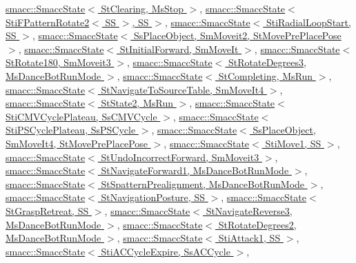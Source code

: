 \hyperlink{classsmacc_1_1SmaccState_afc39f8e0ca4001b2159a100da2fccd0e}{smacc\+::\+Smacc\+State$<$ St\+Clearing, Ms\+Stop $>$}, \hyperlink{classsmacc_1_1SmaccState_afc39f8e0ca4001b2159a100da2fccd0e}{smacc\+::\+Smacc\+State$<$ Sti\+F\+Pattern\+Rotate2$<$ S\+S $>$, S\+S $>$}, \hyperlink{classsmacc_1_1SmaccState_afc39f8e0ca4001b2159a100da2fccd0e}{smacc\+::\+Smacc\+State$<$ Sti\+Radial\+Loop\+Start, S\+S $>$}, \hyperlink{classsmacc_1_1SmaccState_afc39f8e0ca4001b2159a100da2fccd0e}{smacc\+::\+Smacc\+State$<$ Ss\+Place\+Object, Sm\+Moveit2, St\+Move\+Pre\+Place\+Pose $>$}, \hyperlink{classsmacc_1_1SmaccState_afc39f8e0ca4001b2159a100da2fccd0e}{smacc\+::\+Smacc\+State$<$ St\+Initial\+Forward, Sm\+Move\+It $>$}, \hyperlink{classsmacc_1_1SmaccState_afc39f8e0ca4001b2159a100da2fccd0e}{smacc\+::\+Smacc\+State$<$ St\+Rotate180, Sm\+Moveit3 $>$}, \hyperlink{classsmacc_1_1SmaccState_afc39f8e0ca4001b2159a100da2fccd0e}{smacc\+::\+Smacc\+State$<$ St\+Rotate\+Degrees3, Ms\+Dance\+Bot\+Run\+Mode $>$}, \hyperlink{classsmacc_1_1SmaccState_afc39f8e0ca4001b2159a100da2fccd0e}{smacc\+::\+Smacc\+State$<$ St\+Completing, Ms\+Run $>$}, \hyperlink{classsmacc_1_1SmaccState_afc39f8e0ca4001b2159a100da2fccd0e}{smacc\+::\+Smacc\+State$<$ St\+Navigate\+To\+Source\+Table, Sm\+Move\+It4 $>$}, \hyperlink{classsmacc_1_1SmaccState_afc39f8e0ca4001b2159a100da2fccd0e}{smacc\+::\+Smacc\+State$<$ St\+State2, Ms\+Run $>$}, \hyperlink{classsmacc_1_1SmaccState_afc39f8e0ca4001b2159a100da2fccd0e}{smacc\+::\+Smacc\+State$<$ Sti\+C\+M\+V\+Cycle\+Plateau, Ss\+C\+M\+V\+Cycle $>$}, \hyperlink{classsmacc_1_1SmaccState_afc39f8e0ca4001b2159a100da2fccd0e}{smacc\+::\+Smacc\+State$<$ Sti\+P\+S\+Cycle\+Plateau, Ss\+P\+S\+Cycle $>$}, \hyperlink{classsmacc_1_1SmaccState_afc39f8e0ca4001b2159a100da2fccd0e}{smacc\+::\+Smacc\+State$<$ Ss\+Place\+Object, Sm\+Move\+It4, St\+Move\+Pre\+Place\+Pose $>$}, \hyperlink{classsmacc_1_1SmaccState_afc39f8e0ca4001b2159a100da2fccd0e}{smacc\+::\+Smacc\+State$<$ Sti\+Move1, S\+S $>$}, \hyperlink{classsmacc_1_1SmaccState_afc39f8e0ca4001b2159a100da2fccd0e}{smacc\+::\+Smacc\+State$<$ St\+Undo\+Incorrect\+Forward, Sm\+Moveit3 $>$}, \hyperlink{classsmacc_1_1SmaccState_afc39f8e0ca4001b2159a100da2fccd0e}{smacc\+::\+Smacc\+State$<$ St\+Navigate\+Forward1, Ms\+Dance\+Bot\+Run\+Mode $>$}, \hyperlink{classsmacc_1_1SmaccState_afc39f8e0ca4001b2159a100da2fccd0e}{smacc\+::\+Smacc\+State$<$ St\+Spattern\+Prealignment, Ms\+Dance\+Bot\+Run\+Mode $>$}, \hyperlink{classsmacc_1_1SmaccState_afc39f8e0ca4001b2159a100da2fccd0e}{smacc\+::\+Smacc\+State$<$ St\+Navigation\+Posture, S\+S $>$}, \hyperlink{classsmacc_1_1SmaccState_afc39f8e0ca4001b2159a100da2fccd0e}{smacc\+::\+Smacc\+State$<$ St\+Grasp\+Retreat, S\+S $>$}, \hyperlink{classsmacc_1_1SmaccState_afc39f8e0ca4001b2159a100da2fccd0e}{smacc\+::\+Smacc\+State$<$ St\+Navigate\+Reverse3, Ms\+Dance\+Bot\+Run\+Mode $>$}, \hyperlink{classsmacc_1_1SmaccState_afc39f8e0ca4001b2159a100da2fccd0e}{smacc\+::\+Smacc\+State$<$ St\+Rotate\+Degrees2, Ms\+Dance\+Bot\+Run\+Mode $>$}, \hyperlink{classsmacc_1_1SmaccState_afc39f8e0ca4001b2159a100da2fccd0e}{smacc\+::\+Smacc\+State$<$ Sti\+Attack1, S\+S $>$}, \hyperlink{classsmacc_1_1SmaccState_afc39f8e0ca4001b2159a100da2fccd0e}{smacc\+::\+Smacc\+State$<$ Sti\+A\+C\+Cycle\+Expire, Ss\+A\+C\+Cycle $>$}, 